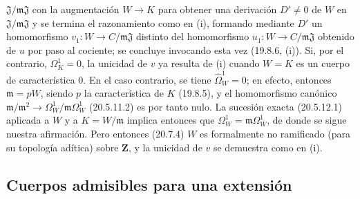\begin{remarks}[21.5.3]
\begin{enumerate}
  $\mathfrak J/\mathfrak m\mathfrak J$ con la augmentación $W\to K$ para
  obtener una derivación $D'\ne0$ de $W$ en
  $\mathfrak J/\mathfrak m\mathfrak J$ y se termina el razonamiento como
  en (i), formando mediante $D'$ un homomorfismo
  $v_1:W\to C/\mathfrak m\mathfrak J$ distinto del homomorfismo
  $u_1:W\to C/\mathfrak m\mathfrak J$ obtenido de $u$ por paso al cociente;
  se concluye invocando esta vez (19.8.6, (i)). Si, por el contrario,
  $\Omega^1_K=0$, la unicidad de $v$ ya resulta de (i) cuando $W=K$ es un
  cuerpo de característica $0$. En el caso contrario, se tiene
  $\widehat{\Omega}^1_W=0$; en efecto, entonces $\mathfrak m=pW$, siendo $p$
  la característica de $K$ (19.8.5), y el homomorfismo canónico
  $\mathfrak m/\mathfrak m^2\to\Omega^1_W/\mathfrak m\Omega^1_W$ (20.5.11.2)
  es por tanto nulo. La sucesión exacta (20.5.12.1) aplicada a $W$ y a
  $K=W/\mathfrak m$ implica entonces que $\Omega^1_W=\mathfrak m\Omega^1_W$,
  de donde se sigue nuestra afirmación. Pero entonces (20.7.4) $W$ es
  formalmente no ramificado (para su topología adítica) sobre $\mathbf Z$, y la
  unicidad de $v$ se demuestra como en (i).
\end{enumerate}
\end{remarks}

\subsection{Cuerpos admisibles para una extensión}
\label{section:0.21.6-fr}

